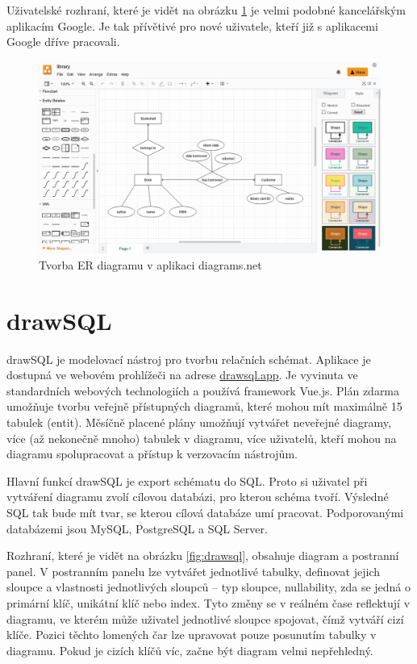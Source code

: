 Uživatelské rozhraní, které je vidět na obrázku \ref{fig:diagrams.net} je velmi
podobné kancelářským aplikacím Google. Je tak přívětivé pro nové uživatele,
kteří již s aplikacemi Google dříve pracovali.

\begin{figure}
  \centering
  \includegraphics[width=\textwidth]{../img/diagrams.net.png}
  \caption{Tvorba ER diagramu v aplikaci diagrams.net}
  \label{fig:diagrams.net}
\end{figure}

\section{drawSQL}

drawSQL je modelovací nástroj pro tvorbu relačních schémat. Aplikace je dostupná
ve webovém prohlížeči na adrese \url{drawsql.app}. Je vyvinuta ve standardních
webových technologiích a používá framework Vue.js. Plán zdarma umožňuje tvorbu
veřejně přístupných diagramů, které mohou mít maximálně 15 tabulek (entit).
Měsíčně placené plány umožňují vytvářet neveřejné diagramy, více (až nekonečně
mnoho) tabulek v diagramu, více uživatelů, kteří mohou na diagramu spolupracovat
a přístup k verzovacím nástrojům.

Hlavní funkcí drawSQL je export schématu do SQL. Proto si uživatel při vytváření
diagramu zvolí cílovou databázi, pro kterou schéma tvoří. Výsledné SQL tak bude
mít tvar, se kterou cílová databáze umí pracovat. Podporovanými databázemi jsou
MySQL, PostgreSQL a SQL Server.

Rozhraní, které je vidět na obrázku \ref{fig:drawsql}, obsahuje diagram a
postranní panel. V postranním panelu lze vytvářet jednotlivé tabulky, definovat
jejich sloupce a vlastnosti jednotlivých sloupců -- typ sloupce, nullability,
zda se jedná o primární klíč, unikátní klíč nebo index. Tyto změny se v reálném
čase reflektují v diagramu, ve kterém může uživatel jednotlivé sloupce spojovat,
čímž vytváří cizí klíče. Pozici těchto lomených čar lze upravovat pouze
posunutím tabulky v diagramu. Pokud je cizích klíčů víc, začne být diagram velmi
nepřehledný.

